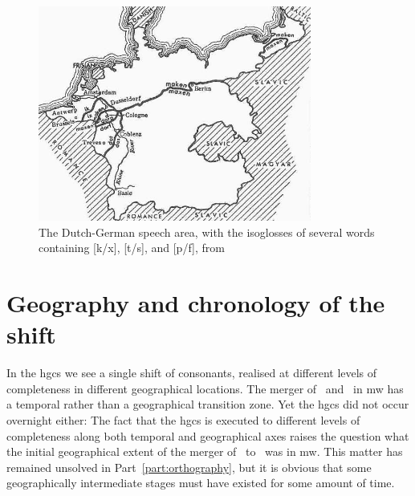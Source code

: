 \begin{figure}[h]
  \centering
  \includegraphics[width=0.8\textwidth]{3orth/images/hgcs.jpg}
  \caption[Bloomfield's isoglosses of the \gls{hgcs}.]{The Dutch-German speech area, with the isoglosses of several words containing [k/x], [t/s], and [p/f], from \textcite[344]{Blo_Language33}}
\label{fig:hgcsmap}
\end{figure}

\section{Geography and chronology of the shift}
\label{sec:geogr-chron-shift}

In the \gls{hgcs} we see a single shift of consonants, realised at different levels of completeness in different geographical locations. The merger of \lT\ and \xD\ in \gls{mw} has a temporal rather than a geographical transition zone. Yet the \gls{hgcs} did not occur overnight either:
The fact that the \gls{hgcs} is executed to different levels of completeness along both temporal and geographical axes raises the question what the initial geographical extent of the merger of \lT\ to \xD\ was in \gls{mw}. This matter has remained unsolved in Part~\ref{part:orthography}, but it is obvious that some geographically intermediate stages must have existed for some amount of time.


